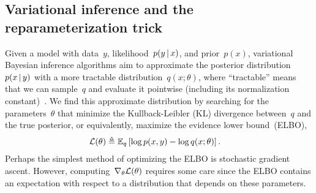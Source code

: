 \documentclass[twoside]{article}
\begin{document}
\subsection{Variational inference and the reparameterization trick}
\label{sub:repa}
Given a model with data~$y$, likelihood~$p(y \, | \, x)$,
and prior~$p(x)$, variational Bayesian inference algorithms aim to
approximate the posterior distribution~$p(x \, | \, y)$ with a more
tractable distribution~$q(x; \theta)$, where ``tractable'' means that
we can sample~$q$ and evaluate it pointwise (including
its normalization constant)~\citep{Blei2017}.  We find this
approximate distribution by searching for the parameters~$\theta$ that
minimize the Kullback-Leibler (KL) divergence between~$q$ and the true
posterior, or equivalently, maximize the evidence lower bound~(ELBO),
\begin{align*}
  \mathcal{L}(\theta) &\triangleq \mathbb{E}_q \left[ \log p(x, y) - \log q(x; \theta) \right].
\end{align*}
Perhaps the simplest method of optimizing the ELBO is stochastic
gradient ascent.  However, computing~$\nabla_\theta \mathcal{L}(\theta)$
requires some care since the ELBO contains an expectation with respect
to a distribution that depends on these parameters.
\end{document}
